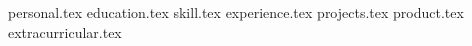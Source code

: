 \documentclass[11pt, a4paper]{awesome-cv}
\newcommand*{\sectiondir}{resume/}
\begin{document}
\makecvheader


{personal.tex}
{education.tex}
{skill.tex}
{experience.tex}
{projects.tex}
{product.tex}
{extracurricular.tex}
\end{document}
